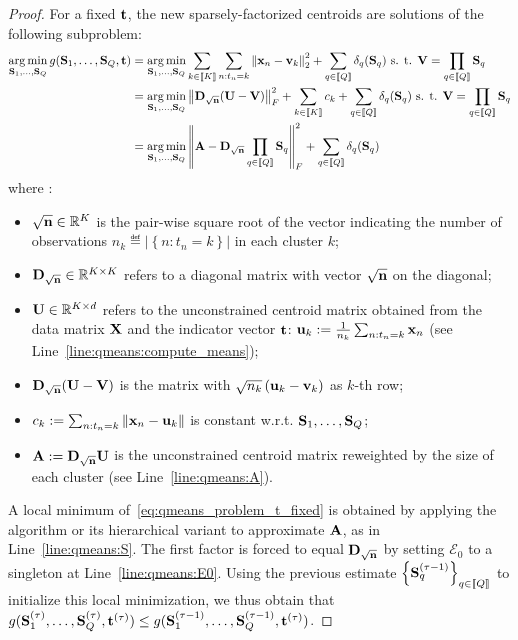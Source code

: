 \begin{proof}
For a fixed ${\mathbf{t}}$, the new sparsely-factorized centroids are solutions of the following subproblem:
%
\begin{align}
 \operatorname*{arg\,min}_{{\mathbf{S}}_1, \ldots,{\mathbf{S}}_Q} g({\mathbf{S}}_1, \ldots,{\mathbf{S}}_Q, {\mathbf{t}}) 
 & = \operatorname*{arg\,min}_{{\mathbf{S}}_1, \ldots,{\mathbf{S}}_Q} \sum_{k\in\left \llbracket K\right \rrbracket}  \sum_{n: t_n = k} \left \| {\mathbf{x}}_n - {\mathbf{v}}_k\right \|^2_2 + \sum_{q\in\left \llbracket Q\right \rrbracket} \delta_q({\mathbf{S}}_q) 
 \text{ s. t. } {\mathbf{V}} = \prod_{q\in\left \llbracket Q\right \rrbracket}{{\mathbf{S}}_q} \nonumber \\
 & = \operatorname*{arg\,min}_{{\mathbf{S}}_1, \ldots,{\mathbf{S}}_Q} \left \| {\mathbf{D}}_{\sqrt{{\mathbf{n}}}} ({\mathbf{U}} - {\mathbf{V}})\right \|_F^2
 + \sum_{k\in\left \llbracket K\right \rrbracket} c_k + \sum_{q\in\left \llbracket Q\right \rrbracket} \delta_q({\mathbf{S}}_q)
 \text{ s. t. } {\mathbf{V}} = \prod_{q\in\left \llbracket Q\right \rrbracket}{{\mathbf{S}}_q} \nonumber\\
  & = \operatorname*{arg\,min}_{{\mathbf{S}}_1, \ldots,{\mathbf{S}}_Q} \left \| {\mathbf{A}} - {\mathbf{D}}_{\sqrt{{\mathbf{n}}}} \prod_{q\in\left \llbracket Q\right \rrbracket}{{\mathbf{S}}_q}\right \|_F^2
 + \sum_{q\in\left \llbracket Q\right \rrbracket} \delta_q({\mathbf{S}}_q)
 \label{eq:qmeans_problem_t_fixed}
\end{align}
%
where :
%
\begin{itemize}
 \item $\sqrt{{\mathbf{n}}} \in \mathbb{R}^{K}$ is the pair-wise square root of the vector indicating the number of observations $n_k \eqdef \left | \left \lbrace n: t_n = k\right \rbrace \right |$  in each cluster $k$;
 \item ${\mathbf{D}}_{\sqrt{{\mathbf{n}}}} \in \mathbb{R}^{K \times K}$ refers to a diagonal matrix with vector $\sqrt{{\mathbf{n}}}$ on the diagonal;
 \item ${\mathbf{U}}\in \mathbb{R}^{K \times d}$ refers to the unconstrained centroid matrix obtained from the data matrix ${\mathbf{X}}$ and the indicator vector ${\mathbf{t}}$: ${\mathbf{u}}_k := \frac{1}{n_k}\sum_{n:t_n = k} {{\mathbf{x}}_n}$ (see Line~\ref{line:qmeans:compute_means});
 \item ${\mathbf{D}}_{\sqrt{{\mathbf{n}}}} ({\mathbf{U}} - {\mathbf{V}})$ is the matrix with $\sqrt{n_k}\left ({\mathbf{u}}_k-{\mathbf{v}}_k\right )$ as $k$-th row;
 \item $c_k := \sum_{n: t_n = k}\left \| {\mathbf{x}}_n - {\mathbf{u}}_k\right \|$ is constant w.r.t. $ {\mathbf{S}}_1, \ldots,{\mathbf{S}}_Q$;
 \item ${\mathbf{A}} := {\mathbf{D}}_{\sqrt{{\mathbf{n}}}} {\mathbf{U}}$ is the unconstrained centroid matrix reweighted by the size of each cluster (see Line~\ref{line:qmeans:A}).
\end{itemize}

A local minimum of~\eqref{eq:qmeans_problem_t_fixed} is obtained by applying the \palm algorithm or its hierarchical variant to approximate ${\mathbf{A}}$, as in Line~\ref{line:qmeans:S}. The first factor is forced to equal ${\mathbf{D}}_{\sqrt{{\mathbf{n}}}}$ by setting $\mathcal{E}_0$ to a singleton at Line~\ref{line:qmeans:E0}. Using the previous estimate $\left \lbrace {\mathbf{S}}_q^{(\tau-1)}\right \rbrace_{q\in\left \llbracket Q\right \rrbracket}$ to initialize this local minimization, we thus obtain that $g({\mathbf{S}}_1^{(\tau)}, \ldots,{\mathbf{S}}_Q^{(\tau)}, {\mathbf{t}}^{(\tau)}) \leq g({\mathbf{S}}_1^{(\tau-1)}, \ldots,{\mathbf{S}}_Q^{(\tau-1)}, {\mathbf{t}}^{(\tau)})$.


\end{proof}
